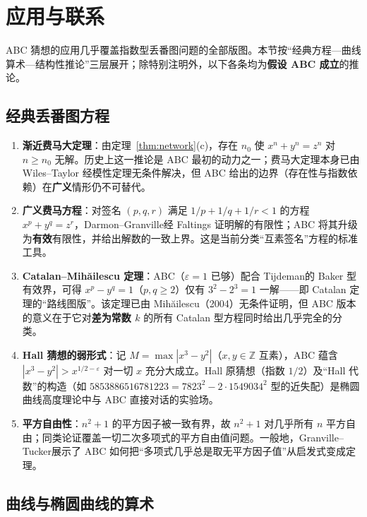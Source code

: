 \section{应用与联系}\label{sec:applications}

ABC 猜想的应用几乎覆盖指数型丢番图问题的全部版图。本节按“经典方程—曲线算术—结构性推论”三层展开；除特别注明外，以下各条均为\textbf{假设 ABC 成立}的推论。

\subsection{经典丢番图方程}

\begin{enumerate}[label=(\arabic*)]
    \item \textbf{渐近费马大定理}：由定理~\ref{thm:network}(c)，存在 $n_0$ 使 $x^n + y^n = z^n$ 对 $n \geq n_0$ 无解。历史上这一推论是 ABC 最初的动力之一；费马大定理本身已由 Wiles--Taylor 经模性定理无条件解决，但 ABC 给出的边界（存在性与指数依赖）在\textbf{广义}情形仍不可替代。
    \item \textbf{广义费马方程}：对签名 $(p, q, r)$ 满足 $1/p + 1/q + 1/r < 1$ 的方程 $x^p + y^q = z^r$，Darmon--Granville\cite{darmongranville1995}经 Faltings 证明解的有限性；ABC 将其升级为\textbf{有效}有限性，并给出解数的一致上界。这是当前分类“互素签名”方程的标准工具。
    \item \textbf{Catalan--Mih\u{a}ilescu 定理}：ABC（$\varepsilon = 1$ 已够）配合 Tijdeman\cite{tijdeman1976}的 Baker 型有效界，可得 $x^p - y^q = 1$（$p, q \geq 2$）仅有 $3^2 - 2^3 = 1$ 一解——即 Catalan 定理的“路线图版”。该定理已由 Mih\u{a}ilescu（2004）\cite{mihailescu2004}无条件证明，但 ABC 版本的意义在于它对\textbf{差为常数 $k$} 的所有 Catalan 型方程同时给出几乎完全的分类。
    \item \textbf{Hall 猜想的弱形式}：记 $M = \max|x^3 - y^2|$（$x, y \in \mathbb{Z}$ 互素），ABC 蕴含 $|x^3 - y^2| > x^{1/2 - \varepsilon}$ 对一切 $x$ 充分大成立。Hall 原猜想（指数 $1/2$）及“Hall 代数”的构造（如 $5853886516781223 = 7823^2 - 2 \cdot 1549034^2$ 型的近失配）是椭圆曲线高度理论中与 ABC 直接对话的实验场。
    \item \textbf{平方自由性}：$n^2 + 1$ 的平方因子被一致有界，故 $n^2 + 1$ 对几乎所有 $n$ 平方自由；同类论证覆盖一切二次多项式的平方自由值问题。一般地，Granville--Tucker\cite{granvilletucker2002}展示了 ABC 如何把“多项式几乎总是取无平方因子值”从启发式变成定理。
\end{enumerate}

\subsection{曲线与椭圆曲线的算术}

